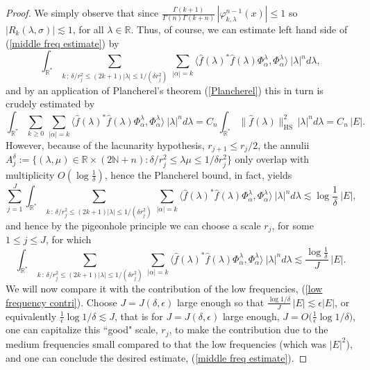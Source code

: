 \documentclass[11pt, reqno]{amsart}
\theoremstyle{plain}
\newcommand{\R}{\ensuremath{\mathbb{R_+}}}
\theoremstyle{remark}
\theoremstyle{example}
\theoremstyle{definition}
\numberwithin{equation}{section}
\def\R{\mathbb{R}}
\begin{document}
\begin{proof}
We simply observe that since $\textstyle \frac{\Gamma(k+1)}{\Gamma(n) \Gamma(k+n)} \, |\varphi^{n-1}_{k, \lambda}(x)| \leq 1$ so $|R_{k}(\lambda, \sigma)| \lesssim 1$, for all $\lambda \in \mathbb{R}$. Thus, of course, we can estimate left hand side of (\ref{middle freq estimate}) by
\begin{equation*}
    \int_{\R^{*}} \sum_{k \, : \, \delta / r_{j}^{2}  \leq (2k+1) |\lambda |  \leq 1/ (\delta r_{j}^2) } \, \sum_{|\alpha|=k} \langle \hat{f}(\lambda)^{*} \hat{f}(\lambda) \Phi_{\alpha}^{\lambda},\Phi_{\alpha}^{\lambda} \rangle \ |\lambda|^n d\lambda, 
\end{equation*}
and by an application of Plancherel's theorem (\ref{Plancherel}) this in turn is crudely estimated by
\begin{equation}
     \int_{\R^{*}} \sum_{k \geq 0 } \, \sum_{|\alpha|=k} \langle \hat{f}(\lambda)^{*} \hat{f}(\lambda) \Phi_{\alpha}^{\lambda},\Phi_{\alpha}^{\lambda} \rangle \ |\lambda|^n d\lambda = C_n  \int_{\R^{*}} \| \hat{f}(\lambda)\|^{2}_{\text{HS}} \, |\lambda|^n d \lambda = C_n \,  |E|.
\end{equation}
However, because of the lacunarity hypothesis, $r_{j+1} \leq r_{j}/2$, the annulii $A^{\delta}_{j}:= \lbrace (\lambda, \mu ) \in \mathbb{R} \times (2 \mathbb{N} +n) : \delta / r_{j}^2 \leq \lambda \mu \leq 1 /  \delta r_{j}^2 \rbrace$ only overlap with multiplicity $O \left( \log \frac{1}{\delta} \right)$, hence the Plancherel bound, in fact, yields
\begin{equation*}
   \sum_{j=1}^{J}  \int_{\R^{*}} \sum_{k \, : \, \delta / r_{j}^{2}  \leq (2k+1) |\lambda |  \leq 1/ (\delta r_{j}^2) } \, \sum_{|\alpha|=k} \langle \hat{f}(\lambda)^{*} \hat{f}(\lambda) \Phi_{\alpha}^{\lambda},\Phi_{\alpha}^{\lambda} \rangle \ |\lambda|^n d\lambda \lesssim    \log \frac{1}{\delta} \ |E|,
\end{equation*}
and hence by the pigeonhole principle we can choose a scale $r_{j}$, for some $1 \leq j \leq J$, for which
\begin{equation*}
    \int_{\R^{*}} \sum_{k \, : \, \delta / r_{j}^{2}  \leq (2k+1) |\lambda |  \leq 1/ (\delta r_{j}^2) } \, \sum_{|\alpha|=k} \langle \hat{f}(\lambda)^{*} \hat{f}(\lambda) \Phi_{\alpha}^{\lambda},\Phi_{\alpha}^{\lambda} \rangle \ |\lambda|^n d\lambda \lesssim   \frac{ \log \frac{1}{\delta} } {J}  \, |E|.
\end{equation*}
We will now compare it with the contribution of the low frequencies, (\ref{low frequency contri}). Choose $J=J(\delta, \epsilon)$ large enough so that $\textstyle \frac{\log 1/ \delta}{J} \, |E| \lesssim \epsilon |E|$, or equivalently $\frac{1}{ {\displaystyle  \epsilon}} \log 1 / \delta \lesssim J$, that is for $J = J (\delta, \epsilon)$ large enough, $J = O \big( \frac{1}{ {\displaystyle  \epsilon}} \log 1 / \delta \big) $, one can capitalize this ``good" scale, $r_{j}$, to make the contribution due to the medium frequencies small compared to that the low frequencies (which was $|E|^2$), and one can conclude the desired estimate, (\ref{middle freq estimate}).
\end{proof}
\end{document}

